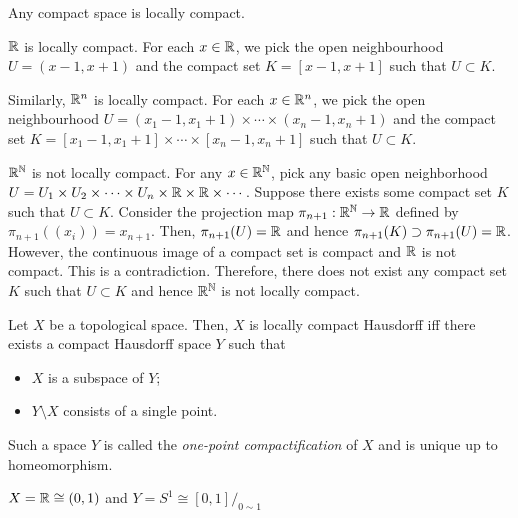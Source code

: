 \begin{example}
    Any compact space is locally compact.
\end{example}

\begin{example}
    $\mathbb{R}$ is locally compact. For each $x\in \mathbb{R}$, we pick the open neighbourhood $U=(x-1,x+1)$ and the compact set $K=[x-1,x+1]$ such that $U\subset K$.

    Similarly, $\mathbb{R}^n$ is locally compact. For each $x\in \mathbb{R}^n$, we pick the open neighbourhood $U=(x_1-1,x_1+1)\times \cdots \times (x_n-1,x_n+1)$ and the compact set $K=[x_1-1,x_1+1]\times \cdots \times [x_n-1,x_n+1]$ such that $U\subset K$.
\end{example}

\begin{example}
    $\mathbb{R}^{\mathbb{N}}$ is not locally compact. For any $x\in \mathbb{R}^{\mathbb{N}}$, pick any basic open neighborhood $U=U_1\times U_2\times\cdots\times U_n\times\mathbb{R}\times \mathbb{R}\times\cdots$. Suppose there exists some compact set $K$ such that $U\subset K$. Consider the projection map $\pi_{n+1}:\mathbb{R}^{\mathbb{N}}\to \mathbb{R}$ defined by $\pi_{n+1}((x_i))=x_{n+1}$. Then, $\pi_{n+1}(U)=\mathbb{R}$ and hence $\pi_{n+1}(K)\supset \pi_{n+1}(U)=\mathbb{R}$. However, the continuous image of a compact set is compact and $\mathbb{R}$ is not compact. This is a contradiction. Therefore, there does not exist any compact set $K$ such that $U\subset K$ and hence $\mathbb{R}^{\mathbb{N}}$ is not locally compact.
\end{example}



\begin{theorem}
    Let $X$ be a topological space. Then, $X$ is locally compact Hausdorff iff there exists a compact Hausdorff space $Y$ such that
    \begin{itemize}
        \item $X$ is a subspace of $Y$;
        \item $Y\setminus X$ consists of a single point.
    \end{itemize}
    Such a space $Y$ is called the \emph{one-point compactification} of $X$ and is unique up to homeomorphism.
\end{theorem}

\begin{example}
    $X=\mathbb{R}\cong (0,1)$ and $Y=S^1\cong [0,1]/_{0\sim 1}$
\end{example}

